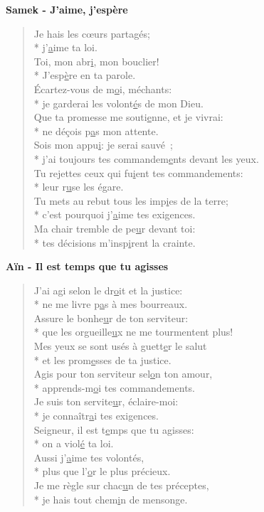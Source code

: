 \textbf{Samek - J’aime, j’espère}
\begin{verse}
Je hais les cœurs partagés; \\*
j’\underline{a}ime ta loi. \\
Toi, mon abr\underline{i}, mon bouclier! \\*
J’esp\underline{è}re en ta parole. \\
Écartez-vous de m\underline{o}i, méchants: \\*
je garderai les volont\underline{é}s de mon Dieu. \\
Que ta promesse me souti\underline{e}nne, et je vivrai: \\*
ne déçois p\underline{a}s mon attente. \\
Sois mon appu\underline{i}: je serai sauvé ; \\*
j’ai toujours tes commandem\underline{e}nts devant les yeux. \\
Tu rejettes ceux qui fu\underline{i}ent tes commandements: \\*
leur r\underline{u}se les égare. \\
Tu mets au rebut tous les imp\underline{i}es de la terre; \\*
c’est pourquoi j’\underline{a}ime tes exigences. \\
Ma chair tremble de pe\underline{u}r devant toi: \\*
tes décisions m’insp\underline{i}rent la crainte. \\
\end{verse}
\textbf{Aïn - Il est temps que tu agisses}
\begin{verse}
J’ai agi selon le dr\underline{o}it et la justice: \\*
ne me livre p\underline{a}s à mes bourreaux. \\
Assure le bonhe\underline{u}r de ton serviteur: \\*
que les orgueille\underline{u}x ne me tourmentent plus! \\
Mes yeux se sont usés à guett\underline{e}r le salut \\*
et les prom\underline{e}sses de ta justice. \\
Agis pour ton serviteur sel\underline{o}n ton amour, \\*
apprends-m\underline{o}i tes commandements. \\
Je suis ton servite\underline{u}r, éclaire-moi: \\*
je connaîtr\underline{a}i tes exigences. \\
Seigneur, il est t\underline{e}mps que tu agisses: \\*
on a viol\underline{é} ta loi. \\
Aussi j’\underline{a}ime tes volontés, \\*
plus que l’\underline{o}r le plus précieux. \\
Je me règle sur chac\underline{u}n de tes préceptes, \\*
je hais tout chem\underline{i}n de mensonge. \\
\end{verse}
